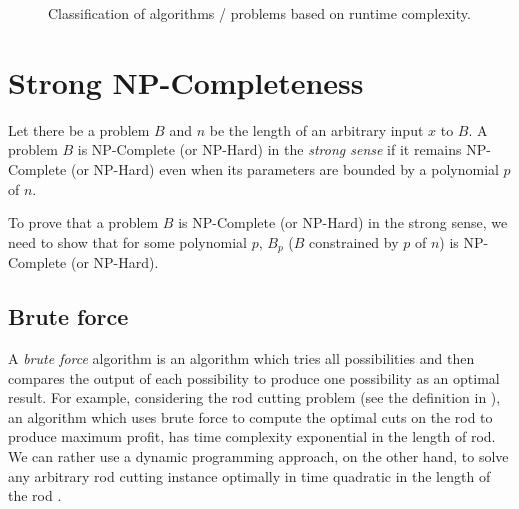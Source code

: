 \begin{figure}
    \begin{minipage}{1\textwidth}
        \centering
    \end{minipage}
    \caption{Classification of algorithms / problems based on runtime complexity.}
    \label{figure:problems-classes}
\end{figure}

\section{Strong NP-Completeness}\label{section:strong-NPC}

Let there be a problem $B$ and $n$ be the length of an arbitrary input $x$ to $B$. A problem $B$ is NP-Complete (or NP-Hard) in the \textit{strong sense} if it remains NP-Complete (or NP-Hard) even when its parameters are bounded by a polynomial $p$ of $n$.

To prove that a problem $B$ is NP-Complete (or NP-Hard) in the strong sense, we need to show \cite{Garey1979} that for some polynomial $p$, $B_p$ ($B$ constrained by $p$ of $n$) is NP-Complete (or NP-Hard).

\subsection{Brute force}

A \textit{brute force} algorithm is an algorithm which tries all possibilities and then compares the output of each possibility to produce one possibility as an optimal result. For example, considering the rod cutting problem (see the definition in ), an algorithm which uses brute force to compute the optimal cuts on the rod to produce maximum profit, has time complexity exponential in the length of rod. We can rather use a dynamic programming approach, on the other hand, to solve any arbitrary rod cutting instance optimally in time quadratic in the length of the rod \cite{Cormen}.


